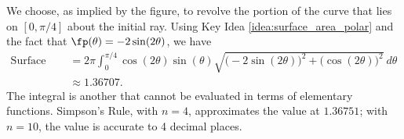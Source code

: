 {
We choose, as implied by the figure, to revolve the portion of the curve that lies on $[0,\pi/4]$ about the initial ray. Using Key Idea \ref{idea:surface_area_polar} and the fact that $\fp(\theta) = -2\sin(2\theta)$, we have
\begin{align*}
\text{Surface Area} &= 2\pi\int_0^{\pi/4} \cos(2\theta)\sin(\theta)\sqrt{\big(-2\sin(2\theta)\big)^2+\big(\cos(2\theta)\big)^2}\ d\theta \\
&\approx 1.36707.
\end{align*}
The integral is another that cannot be evaluated in terms of elementary functions. Simpson's Rule, with $n=4$, approximates the value at $1.36751$; with $n=10$, the value is accurate to 4 decimal places.
}\\

